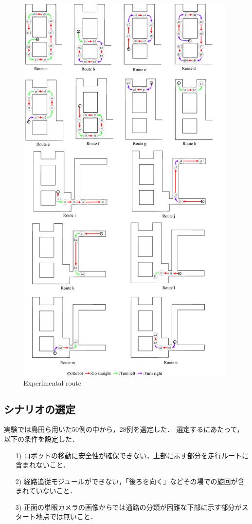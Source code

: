 \begin{figure}
  \centering
  \includegraphics[width=110mm]{images/pdf/ishiguro/route.pdf}
  \caption{Experimental route}
  \label{fig:route}
\end{figure}

\newpage
\subsection{シナリオの選定}
実験では島田ら用いた50例の中から，28例を選定した．
選定するにあたって，以下の条件を設定した．

\begin{enumerate}
  \item [1)] ロボットの移動に安全性が確保できない，上部に示す部分を走行ルートに含まれないこと．
  \item [2)] 経路追従モジュールができない，「後ろを向く」などその場での旋回が含まれていないこと．
  \item [3)] 正面の単眼カメラの画像からでは通路の分類が困難な下部に示す部分がスタート地点では無いこと．
\end{enumerate}
 
